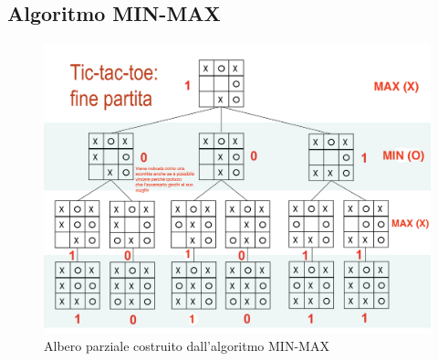 \documentclass{article}
\begin{document}
\subsection{Algoritmo MIN-MAX}
\begin{figure}[H]
\centering
\includegraphics[scale=0.45]{Images/minmaxtictactoe.png}
\caption{Albero parziale costruito dall'algoritmo MIN-MAX}
\end{figure}
\end{document}
